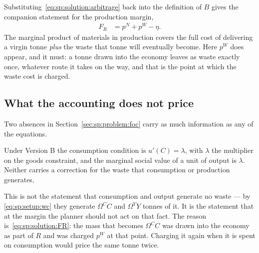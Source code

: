 Substituting~\eqref{eq:sp:solution:arbitrage} back into the definition of $B$ gives the companion
statement for the production margin,
\begin{align}
F_R &= p^N+p^W-\eta .
\label{eq:sp:solution:FR}
\end{align}
The marginal product of materials in production covers the full cost of delivering a virgin tonne
\emph{plus} the waste that tonne will eventually become. Here $p^W$ does appear, and it must: a
tonne drawn into the economy leaves as waste exactly once, whatever route it takes on the way, and
that is the point at which the waste cost is charged.


\subsection{What the accounting does not price}\label{sec:sp:solution:nowedge}

Two absences in Section~\ref{sec:sp:problem:foc} carry as much information as any of the equations.

\begin{proposition}\label{prop:sp:nowedge}
Under Version B the consumption condition is $u'(C)=\lambda$, with $\lambda$ the multiplier on the
goods constraint, and the marginal social value of a unit of output is $\lambda$. Neither carries a
correction for the waste that consumption or production generates.
\end{proposition}

This is not the statement that consumption and output generate no waste --- by
\eqref{eq:sp:setup:wc} they generate $\Omega^CC$ and $\Omega^YY$ tonnes of it. It is the statement
that at the margin the planner should not act on that fact. The reason is~\eqref{eq:sp:solution:FR}:
the mass that becomes $\Omega^CC$ was drawn into the economy as part of $R$ and was charged $p^W$ at
that point. Charging it again when it is spent on consumption would price the same tonne twice.

